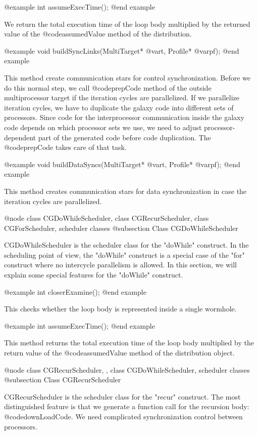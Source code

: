 {@example
int assumeExecTime();
@end example

We return the total execution time of the loop body multiplied by the
returned value of the @code{assumedValue} method of the distribution.

@example
void buildSyncLinks(MultiTarget* @var{t}, Profile* @var{pf});
@end example

This method create communication stars for control synchronization.
Before we do this normal step, we call @code{prepCode} method of the
outside multiprocessor target if the iteration cycles are parallelized.
If we parallelize iteration cycles, we have to duplicate the galaxy code
into different sets of processors. Since code for
the interprocessor communication inside the
galaxy code depends on which processor sets we use, we need to
adjust processor-dependent part of the generated code before code
duplication. The @code{prepCode} takes care of that task.

@example
void buildDataSyncs(MultiTarget* @var{t}, Profile* @var{pf});
@end example

This method creates communication stars for data synchronization in case the
iteration cycles are parallelized.

@node class CGDoWhileScheduler, class CGRecurScheduler, class CGForScheduler, scheduler classes
@subsection Class CGDoWhileScheduler

CGDoWhileScheduler is the scheduler class for the "doWhile" construct.
In the scheduling point of view, the "doWhile" construct
is a special case of the "for" construct where no intercycle parallelism
is allowed.
In this section, we will explain some special features for the "doWhile"
construct.

@example
int closerExamine();
@end example

This checks whether the loop body is represented inside a single wormhole.

@example
int assumeExecTime();
@end example

This method returns the total execution time of the loop body multiplied by
the return value of the @code{assumedValue} method of the distribution object.

@node class CGRecurScheduler, , class CGDoWhileScheduler, scheduler classes
@subsection Class CGRecurScheduler

CGRecurScheduler is the scheduler class for the "recur" construct.
The most distinguished feature is that we generate a function call for
the recursion body: @code{downLoadCode}. We need complicated 
synchronization control between processors. 

}

